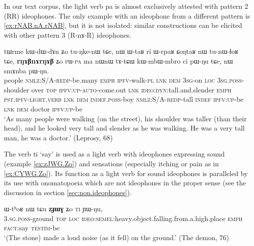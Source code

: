 \documentclass[oldfontcommands,oneside,a4paper,11pt]{article}
\newcommand{\ipa}[1]{{\phon \mbox{#1}}} %
\begin{document}
In our text corpus, the light verb \ipa{pa} is almost exclusively attested with pattern 2 (RR) ideophones. The only example with an ideophone from a different pattern is \ref{ex:rNAB.nA.rNAB}, but it is not isolated: similar constructions  can be elicited with other pattern 3 (R\ipa{-nɤ-}R) ideophones.
\begin{exe}
\ex \label{ex:rNAB.nA.rNAB}
\gll
\ipa{tɯrme}  	\ipa{kɯ-dɯ-dɤn}  	\ipa{ʑo}  	\ipa{tu-ŋke-nɯ}  	\ipa{tɕe,}  	\ipa{nɯ}  	\ipa{ɯ-taʁ}  	\ipa{ri}  	\ipa{ɯ-rpaʁ}  	\ipa{ɕoŋtaʁ}  	\ipa{nɯ}  	\ipa{tu-nɯ-ɬoʁ}  	\ipa{tɕe,}  	\ipa{\textbf{rŋɤβnɤrŋɤβ}}  	\ipa{ʑo}  	\textsc{\ipa{pɯ-pa}}  	\ipa{ma}  	\ipa{nɯnɯ}  	\ipa{tɤ-tɕɯ}  	\ipa{kɯ-mbɯ-mbro}  	\ipa{ci}  	\ipa{pɯ-ŋu}  	\ipa{tɕe,}  	\ipa{nɯ}  	\ipa{smɤnba}  	\ipa{pɯ-ŋu.}  \\
people \textsc{nmlz:S/A-redp}-be.many \textsc{emph} \textsc{ipfv}-walk-\textsc{pl} \textsc{lnk} \textsc{dem} \textsc{3sg}-on \textsc{loc} \textsc{3sg.poss}-shoulder over \textsc{top} \textsc{ipfv:up-auto}-come.out \textsc{lnk} \textsc{ideo:dyn}:tall.and.slender \textsc{emph} \textsc{pst.ipfv-light.verb} \textsc{lnk} \textsc{dem} \textsc{indef.poss}-boy \textsc{nmlz:S/A-redp}-tall \textsc{indef} \textsc{ipfv:up}-be \textsc{lnk} \textsc{dem} doctor \textsc{ipfv:up}-be \\
\glt `As many people were walking (on the street), his shoulder was taller (than their  head), and he looked very tall and slender as he was walking. He was a very tall man, he was a doctor.'
 (Leprosy, 68)
\end{exe}

The verb \ipa{ti}   `say' is used as a light verb with  ideophones expressing sound (example \ref{ex:zJWG.Zo}) and sensations (especially itching or pain as in \ref{ex:CYWG.Zo}). Its function as a light verb for sound ideophones is paralleled by its use with onomatopoeia which are not ideophones in the proper sense (see the discussion in  section \ref{sec:non.ideophones}).

\begin{exe}
\ex \label{ex:zJWG.Zo}
\gll
 \ipa{ɯ-tʰoʁ} 	\ipa{nɯ} 	\ipa{tɕu} 	\ipa{\textbf{zɟɯɣ}} 	\ipa{ʑo} 	\textsc{\ipa{ti}} 	\ipa{ɲɯ-ŋu,} \\
\textsc{3.sg.poss}-ground \textsc{top} \textsc{loc} \textsc{ideo:semel}:heavy.object.falling.from.a.high.place \textsc{emph} \textsc{fact}:say \textsc{testim}-be \\
\glt `(The stone) made a loud noise (as it fell) on the ground.' (The demon, 76)
\end{exe}
 
\end{document}
